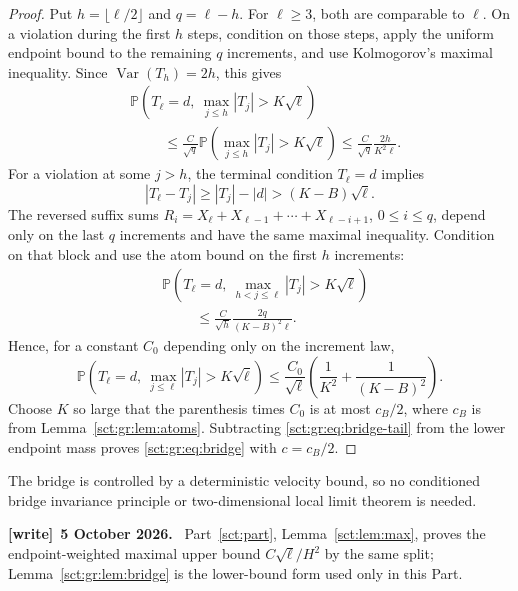 \documentclass[11pt,letterpaper]{article}
\theoremstyle{definition}\newtheorem{remark}[theorem]{Remark}
\newcommand{\Pp}{\mathbb P}\newcommand{\Ee}{\mathbb E}
\newenvironment{writenote}[1][]{\par\smallskip\begingroup\small
 \noindent\textbf{[write]}\if\relax\detokenize{#1}\relax\else~\textbf{#1.}\fi\ }%
 {\par\endgroup\smallskip}
\begin{document}
\begin{proof}
Put $h=\lfloor\ell/2\rfloor$ and $q=\ell-h$. For $\ell\ge3$, both are
comparable to $\ell$. On a violation during the first $h$ steps, condition
on those steps, apply the uniform endpoint bound to the remaining $q$
increments, and use Kolmogorov's maximal inequality. Since
$\operatorname{Var}(T_h)=2h$, this gives
\begin{align*}
 &\Pp\!\left(T_\ell=d,\ \max_{j\le h}|T_j|>K\sqrt\ell\right)\\
 &\hspace{1cm}\le \frac{C}{\sqrt q}
      \Pp\!\left(\max_{j\le h}|T_j|>K\sqrt\ell\right)
 \le\frac{C}{\sqrt q}\frac{2h}{K^2\ell}.
\end{align*}
For a violation at some $j>h$, the terminal condition $T_\ell=d$ implies
\[
 |T_\ell-T_j|\ge |T_j|-|d|>(K-B)\sqrt\ell.
\]
The reversed suffix sums
$R_i=X_\ell+X_{\ell-1}+\cdots+X_{\ell-i+1}$, $0\le i\le q$,
depend only on the last $q$ increments and have the same maximal inequality.
Condition on that block and use the atom bound on the first $h$ increments:
\begin{align*}
 &\Pp\!\left(T_\ell=d,\ \max_{h<j\le\ell}|T_j|>K\sqrt\ell\right)\\
 &\hspace{1cm}\le\frac{C}{\sqrt h}\frac{2q}{(K-B)^2\ell}.
\end{align*}
Hence, for a constant $C_0$ depending only on the increment law,
\begin{equation}\label{sct:gr:eq:bridge-tail}
 \Pp\!\left(T_\ell=d,\ \max_{j\le\ell}|T_j|>K\sqrt\ell\right)
 \le\frac{C_0}{\sqrt\ell}
 \left(\frac1{K^2}+\frac1{(K-B)^2}\right).
\end{equation}
Choose $K$ so large that the parenthesis times $C_0$ is at most $c_B/2$,
where $c_B$ is from Lemma~\ref{sct:gr:lem:atoms}. Subtracting
\eqref{sct:gr:eq:bridge-tail} from the lower endpoint mass proves
\eqref{sct:gr:eq:bridge} with $c=c_B/2$.
\end{proof}

The bridge is controlled by a deterministic velocity bound, so no conditioned
bridge invariance principle or two-dimensional local limit theorem is needed.
\begin{writenote}[5 October 2026]
Part~\ref{sct:part}, Lemma~\ref{sct:lem:max}, proves the endpoint-weighted maximal upper bound $C\sqrt\ell/H^2$ by the same split; Lemma~\ref{sct:gr:lem:bridge} is the lower-bound form used only in this Part.
\end{writenote}
\end{document}
